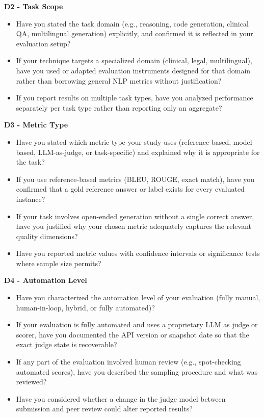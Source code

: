 \documentclass[journal]{IEEEtran}
\begin{document}
\textbf{D2 - Task Scope}
\begin{itemize}
  \item Have you stated the task domain (e.g., reasoning, code generation,
        clinical QA, multilingual generation) explicitly, and confirmed it
        is reflected in your evaluation setup?
  \item If your technique targets a specialized domain (clinical,
        legal, multilingual), have you used or adapted evaluation
        instruments designed for that domain rather than borrowing
        general NLP metrics without justification?
  \item If you report results on multiple task types, have you analyzed
        performance separately per task type rather than reporting only
        an aggregate?
\end{itemize}

\textbf{D3 - Metric Type}
\begin{itemize}
  \item Have you stated which metric type your study uses
        (reference-based, model-based, LLM-as-judge, or task-specific)
        and explained why it is appropriate for the task?
  \item If you use reference-based metrics (BLEU, ROUGE, exact match),
        have you confirmed that a gold reference answer or label exists
        for every evaluated instance?
  \item If your task involves open-ended generation without a single
        correct answer, have you justified why your chosen metric
        adequately captures the relevant quality dimensions?
  \item Have you reported metric values with confidence intervals or
        significance tests where sample size permits?
\end{itemize}

\textbf{D4 - Automation Level}
\begin{itemize}
  \item Have you characterized the automation level of your evaluation
        (fully manual, human-in-loop, hybrid, or fully automated)?
  \item If your evaluation is fully automated and uses a proprietary
        LLM as judge or scorer, have you documented the API version or
        snapshot date so that the exact judge state is recoverable?
  \item If any part of the evaluation involved human review (e.g.,
        spot-checking automated scores), have you described the
        sampling procedure and what was reviewed?
  \item Have you considered whether a change in the judge model between
        submission and peer review could alter reported results?
\end{itemize}
\end{document}

